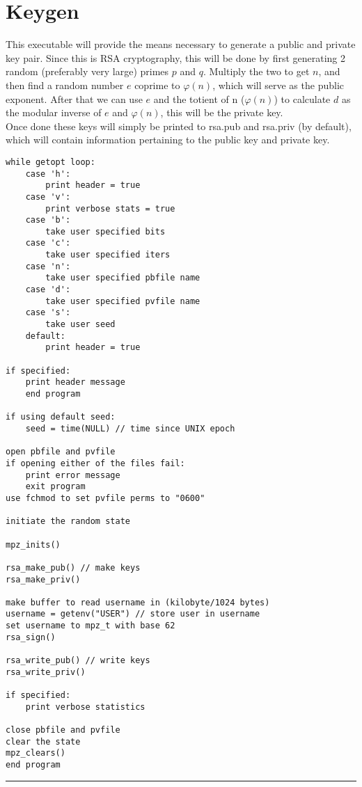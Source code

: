 \documentclass[
	12pt, %
]{fphw}
\begin{document}
\section{Keygen}
This executable will provide the means necessary to generate a public and private key pair. Since this is RSA cryptography, this will be done by first generating 2 random (preferably very large) primes $p$ and $q$. Multiply the two to get $n$, and then find a random number $e$ coprime to $\varphi(n)$, which will serve as the public exponent. After that we can use $e$ and the totient of n ($\varphi(n)$) to calculate $d$ as the modular inverse of $e$ and $\varphi(n)$, this will be the private key. \\
Once done these keys will simply be printed to rsa.pub and rsa.priv (by default), which will contain information pertaining to the public key and private key.
\begin{lstlisting}[mathescape=true]
while getopt loop:
	case 'h':
		print header = true
	case 'v':
		print verbose stats = true
	case 'b':
		take user specified bits
	case 'c':
		take user specified iters
	case 'n':
		take user specified pbfile name
	case 'd':
		take user specified pvfile name
	case 's':
		take user seed
	default:
		print header = true
		
if specified:
	print header message
	end program
	
if using default seed:
	seed = time(NULL) // time since UNIX epoch
	
open pbfile and pvfile
if opening either of the files fail:
	print error message
	exit program
use fchmod to set pvfile perms to "0600"

initiate the random state
	
mpz_inits()

rsa_make_pub() // make keys
rsa_make_priv()

make buffer to read username in (kilobyte/1024 bytes)
username = getenv("USER") // store user in username
set username to mpz_t with base 62
rsa_sign()

rsa_write_pub() // write keys
rsa_write_priv()

if specified:
	print verbose statistics

close pbfile and pvfile
clear the state
mpz_clears()
end program
\end{lstlisting}

\noindent\rule{6.3in}{0.4pt}

\end{document}
